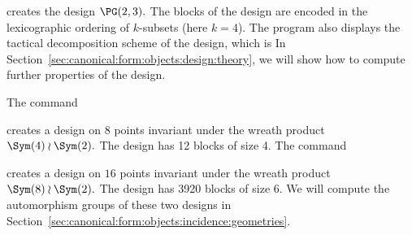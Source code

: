 
creates the design $\PG(2,3).$ 
The blocks of the design are encoded in the lexicographic ordering of $k$-subsets (here $k=4$).
The program also displays the tactical decomposition scheme of the design, which is
In Section~\ref{sec:canonical:form:objects:design:theory}, we will show how to compute 
further properties of the design.


\bigskip

The command 


creates a design on $8$ points invariant under the wreath product $\Sym(4) \wr \Sym(2).$
The design has 12 blocks of size 4. 
The command 


creates a design on $16$ points invariant under the wreath product $\Sym(8) \wr \Sym(2).$
The design has 3920 blocks of size 6. 
We will compute the automorphism groups of these two designs in Section~\ref{sec:canonical:form:objects:incidence:geometries}.


\bigskip

